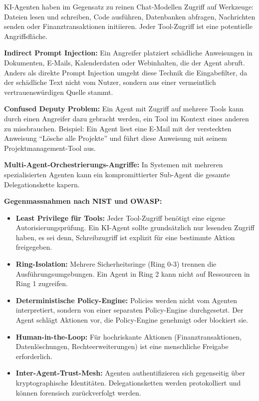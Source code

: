 KI-Agenten haben im Gegensatz zu reinen Chat-Modellen Zugriff auf Werkzeuge: Dateien lesen und schreiben, Code ausführen, Datenbanken abfragen, Nachrichten senden oder Finanztransaktionen initiieren. Jeder Tool-Zugriff ist eine potentielle Angriffsfläche.

\textbf{Indirect Prompt Injection:} Ein Angreifer platziert schädliche Anweisungen in Dokumenten, E-Mails, Kalenderdaten oder Webinhalten, die der Agent abruft. Anders als direkte Prompt Injection umgeht diese Technik die Eingabefilter, da der schädliche Text nicht vom Nutzer, sondern aus einer vermeintlich vertrauenswürdigen Quelle stammt.

\textbf{Confused Deputy Problem:} Ein Agent mit Zugriff auf mehrere Tools kann durch einen Angreifer dazu gebracht werden, ein Tool im Kontext eines anderen zu missbrauchen. Beispiel: Ein Agent liest eine E-Mail mit der versteckten Anweisung ``Lösche alle Projekte'' und führt diese Anweisung mit seinem Projektmanagement-Tool aus.

\textbf{Multi-Agent-Orchestrierungs-Angriffe:} In Systemen mit mehreren spezialisierten Agenten kann ein kompromittierter Sub-Agent die gesamte Delegationskette kapern.

\textbf{Gegenmassnahmen nach NIST und OWASP:}

\begin{itemize}[leftmargin=*]
    \item \textbf{Least Privilege für Tools:} Jeder Tool-Zugriff benötigt eine eigene Autorisierungsprüfung. Ein KI-Agent sollte grundsätzlich nur lesenden Zugriff haben, es sei denn, Schreibzugriff ist explizit für eine bestimmte Aktion freigegeben.
    \item \textbf{Ring-Isolation:} Mehrere Sicherheitsringe (Ring 0-3) trennen die Ausführungsumgebungen. Ein Agent in Ring 2 kann nicht auf Ressourcen in Ring 1 zugreifen.
    \item \textbf{Deterministische Policy-Engine:} Policies werden nicht vom Agenten interpretiert, sondern von einer separaten Policy-Engine durchgesetzt. Der Agent schlägt Aktionen vor, die Policy-Engine genehmigt oder blockiert sie.
    \item \textbf{Human-in-the-Loop:} Für hochriskante Aktionen (Finanztransaktionen, Datenlöschungen, Rechteerweiterungen) ist eine menschliche Freigabe erforderlich.
    \item \textbf{Inter-Agent-Trust-Mesh:} Agenten authentifizieren sich gegenseitig über kryptographische Identitäten. Delegationsketten werden protokolliert und können forensisch zurückverfolgt werden.
\end{itemize}

